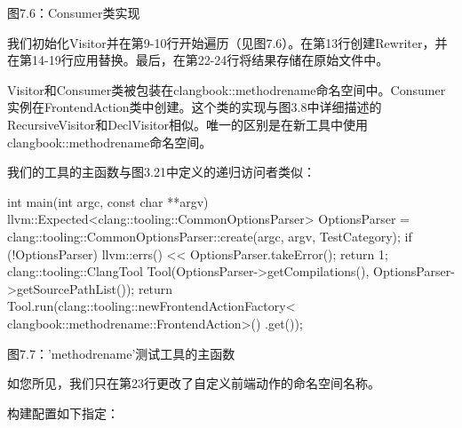 \begin{center}
图7.6：Consumer类实现
\end{center}

我们初始化Visitor并在第9-10行开始遍历（见图7.6）。在第13行创建Rewriter，并在第14-19行应用替换。最后，在第22-24行将结果存储在原始文件中。

Visitor和Consumer类被包装在clangbook::methodrename命名空间中。Consumer实例在FrontendAction类中创建。这个类的实现与图3.8中详细描述的RecursiveVisitor和DeclVisitor相似。唯一的区别是在新工具中使用clangbook::methodrename命名空间。


我们的工具的主函数与图3.21中定义的递归访问者类似：

\begin{cpp}
int main(int argc, const char **argv) {
  llvm::Expected<clang::tooling::CommonOptionsParser> OptionsParser =
    clang::tooling::CommonOptionsParser::create(argc, argv, TestCategory);
  if (!OptionsParser) {
    llvm::errs() << OptionsParser.takeError();
    return 1;
  }
  clang::tooling::ClangTool Tool(OptionsParser->getCompilations(),
                                 OptionsParser->getSourcePathList());
   return Tool.run(clang::tooling::newFrontendActionFactory<
                   clangbook::methodrename::FrontendAction>()
                   .get());
}
\end{cpp}

\begin{center}
图7.7：'methodrename'测试工具的主函数
\end{center}

如您所见，我们只在第23行更改了自定义前端动作的命名空间名称。

构建配置如下指定：


